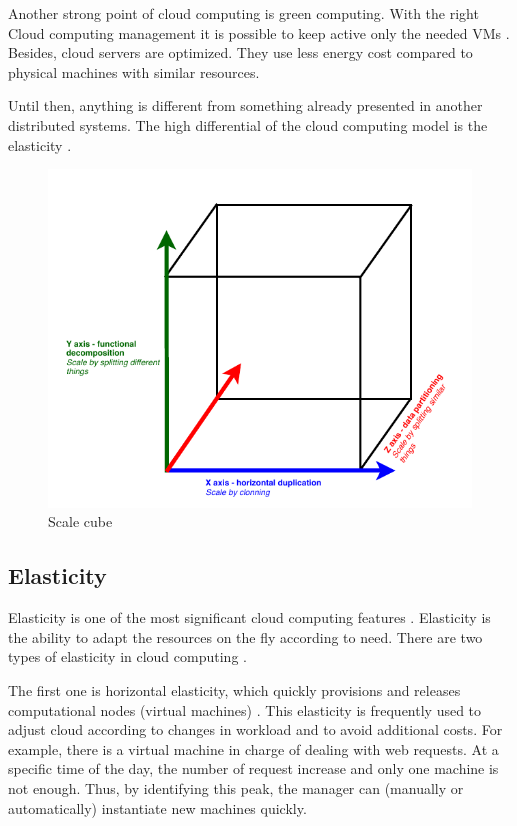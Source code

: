 Another strong point of cloud computing is green computing. With the right Cloud computing management it is possible to keep active only the needed VMs \cite{Righi2013ElasticidadeDesafios}. Besides, cloud servers are optimized. They use less energy cost compared to physical machines with similar resources.

Until then, anything is different from something already presented in another distributed systems. The high differential of the cloud computing model is the elasticity \cite{Righi2013ElasticidadeDesafios}.

\begin{figure}[ht]
\centering
\includegraphics{Images/ScaleCube.pdf}
\caption{Scale cube \cite{MartinL.Abbott2015TheLivros}}
\label{scaleCube}
\end{figure}


\subsection{Elasticity}

Elasticity is one of the most significant cloud computing features \cite{Molto2013ElasticRequirements}. Elasticity is the ability to adapt the resources on the fly according to need. There are two types of elasticity in cloud computing \cite{Righi2013ElasticidadeDesafios}. 

The first one is horizontal elasticity, which quickly provisions and releases computational nodes (virtual machines)  \cite{Molto2013ElasticRequirements}. This elasticity is frequently used to adjust cloud according to changes in workload and to avoid additional costs. For example, there is a virtual machine in charge of dealing with web requests. At a specific time of the day, the number of request increase and only one machine is not enough. Thus, by identifying this peak, the manager can (manually or automatically) instantiate new machines quickly.

